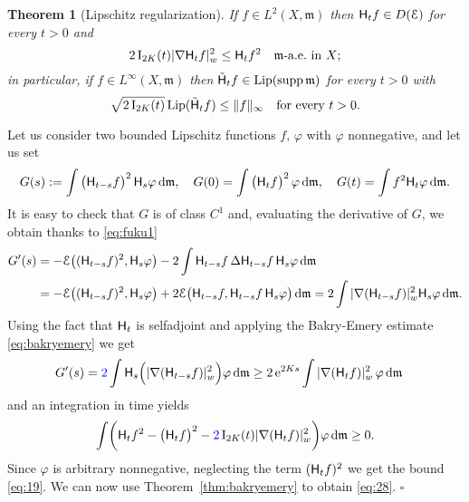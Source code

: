 \documentclass[reqno,11pt]{article}
\numberwithin{equation}{section}
\newcommand{\cE}{{\ensuremath{\mathcal E}}}
\newcommand{\mm}{{\mbox{\boldmath$m$}}}
\newcommand{\rme}{{\mathrm e}}
\newcommand{\supp}{\mathop{\rm supp}\nolimits}   %
\newcommand{\Lip}{\mathop{\rm Lip}\nolimits}          %
\renewcommand{\d}{{\mathrm d}}
\newcommand{\forevery}{\text{for every }}
\newenvironment{proof}{\removelastskip\par\medskip   %
\noindent{\em Proof.}
\rm}{\penalty-20\null\hfill$\square$\par\medbreak}
\newtheorem{theorem}{Theorem}[section]
\newcommand{\weakgrad}[1]{|\nabla #1|_w}                %
\newcommand{\heatl}{{\sf H}}
\newcommand{\Deltam}{\Delta}
\renewcommand{\mm}{\mathfrak m}
\begin{document}
\begin{theorem}[Lipschitz regularization]\label{thm:lipreg}
If $f\in L^2(X,\mm)$ then $\heatl_t f\in D(\cE)$ for
    every $t>0$ and
    \begin{equation}
      \label{eq:19}
      2\, \mathrm I_{2K}(t)\weakgrad {\heatl_t f }^2\le \heatl_t
      f^2\quad\mm\text{-a.e.\ in $X$};
    \end{equation}
    in particular,
  if $f\in L^\infty(X,\mm)$ then $\tilde\heatl_t f\in \Lip(\supp\mm)$ for every
  $t>0$ with
  \begin{equation}
    \label{eq:28}
    \sqrt{2\,\mathrm I_{2K}(t)}\,{\rm Lip}(\tilde\heatl_t f)\le
    \|f\|_\infty\quad\forevery t>0.
  \end{equation}
\end{theorem}
\begin{proof}
  Let us consider two bounded Lipschitz functions $f,\,\varphi$
  with $\varphi$ nonnegative, and let us set
  \begin{equation}
    \label{eq:27}
    G(s):=\int \big(\heatl_{t-s} f\big)^2\,\heatl_s \varphi\,\d\mm,\quad
    G(0)=\int \big(\heatl_{t} f\big)^2\, \varphi\,\d\mm,\quad
    G(t)=\int f^2\heatl_t\varphi\,\d\mm.
  \end{equation}
  It is easy to check that $G$ is of class $C^1$
  and, evaluating the derivative of $G$, we obtain
  thanks to \eqref{eq:fuku1}
  \begin{align*}
    G'(s)&=-\mathcal E\big((\heatl_{t-s} f)^2,\heatl_s
    \varphi\big)-2\int \heatl_{t-s} f\, \Deltam \heatl_{t-s} f\,
    \heatl_{s} \varphi\,\d\mm \\&= -\mathcal E\big((\heatl_{t-s}
    f)^2,\heatl_s \varphi\big)+2\mathcal E \bigl(\heatl_{t-s} f,
    \heatl_{t-s} f\, \heatl_{s} \varphi\bigr)\,\d\mm=
    2\int
    \weakgrad{(\heatl_{t-s} f)}^2 \heatl_s \varphi\,\d\mm.
  \end{align*}
  Using the fact that $\heatl_t$ is
  selfadjoint and applying the Bakry-Emery estimate \eqref{eq:bakryemery}
  we get
  \begin{align*}
    G'(s)&={\color{blue}2}\int \heatl_s\Big(\weakgrad{(\heatl_{t-s} f)}^2\Big)
    \varphi\,\d\mm \ge 2\,\rme^{2K s}\int \weakgrad{(\heatl_{t}
      f)}^2\,\varphi\,\d\mm
  \end{align*}
  and an integration in time yields
  \begin{equation}
    \label{eq:29}
    \int \biggl(\heatl_t f^2-\big(\heatl_t f\big)^2-{\color{blue}2}\,\mathrm I_{2K}(t)
    \weakgrad{(\heatl_{t} f)}^2\biggr)\varphi\,\d\mm\ge0.
  \end{equation}
  Since $\varphi$ is arbitrary nonnegative, neglecting the term $(\heatl_t f)^2$ we get
  the bound \eqref{eq:19}.
  We can now use
  Theorem~\ref{thm:bakryemery} to obtain \eqref{eq:28}.
\end{proof}
\end{document}
